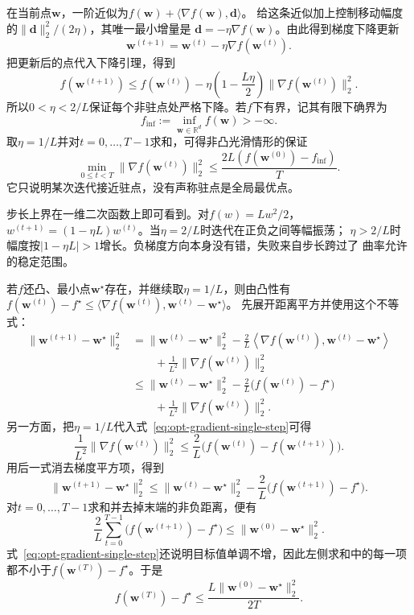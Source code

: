 在当前点$\bm w$，一阶近似为$f(\bm w)+\langle\nabla f(\bm w),\bm d\rangle$。
给这条近似加上控制移动幅度的$\|\bm d\|_2^2/(2\eta)$，其唯一最小增量是
$\bm d=-\eta\nabla f(\bm w)$。由此得到梯度下降更新
\begin{equation}
  \bm{w}^{(t+1)}
  =\bm{w}^{(t)}-\eta\nabla f(\bm{w}^{(t)}).
  \label{eq:opt-gradient-descent}
\end{equation}
把更新后的点代入下降引理，得到
\begin{equation}
  f(\bm{w}^{(t+1)})
  \leq f(\bm{w}^{(t)})
  -\eta\left(1-\frac{L\eta}{2}\right)
  \lVert\nabla f(\bm{w}^{(t)})\rVert_2^2.
  \label{eq:opt-gradient-single-step}
\end{equation}
所以$0<\eta<2/L$保证每个非驻点处严格下降。若$f$下有界，记其有限下确界为
\[
  f_{\inf}:=\inf_{\bm{w}\in\mathbb{R}^d}f(\bm{w})>-\infty.
\]
取$\eta=1/L$并对$t=0,\ldots,T-1$求和，可得非凸光滑情形的保证
\begin{equation}
  \min_{0\leq t<T}\lVert\nabla f(\bm{w}^{(t)})\rVert_2^2
  \leq
  \frac{2L(f(\bm{w}^{(0)})-f_{\inf})}{T}.
  \label{eq:opt-nonconvex-gradient-rate}
\end{equation}
它只说明某次迭代接近驻点，没有声称驻点是全局最优点。

步长上界在一维二次函数上即可看到。对$f(w)=Lw^2/2$，
$w^{(t+1)}=(1-\eta L)w^{(t)}$。当$\eta=2/L$时迭代在正负之间等幅振荡；
$\eta>2/L$时幅度按$|1-\eta L|>1$增长。负梯度方向本身没有错，失败来自步长跨过了
曲率允许的稳定范围。

若$f$还凸、最小点$\bm{w}^{\star}$存在，并继续取$\eta=1/L$，则由凸性有
$f(\bm{w}^{(t)})-f^\star
\leq\langle\nabla f(\bm{w}^{(t)}),\bm{w}^{(t)}-\bm{w}^{\star}\rangle$。
先展开距离平方并使用这个不等式：
\begin{align*}
  \lVert\bm{w}^{(t+1)}-\bm{w}^{\star}\rVert_2^2
  &=
  \lVert\bm{w}^{(t)}-\bm{w}^{\star}\rVert_2^2
  -\frac{2}{L}
  \left\langle\nabla f(\bm{w}^{(t)}),
  \bm{w}^{(t)}-\bm{w}^{\star}\right\rangle\\
  &\qquad
  +\frac{1}{L^2}\lVert\nabla f(\bm{w}^{(t)})\rVert_2^2\\
  &\leq
  \lVert\bm{w}^{(t)}-\bm{w}^{\star}\rVert_2^2
  -\frac{2}{L}\bigl(f(\bm{w}^{(t)})-f^\star\bigr)\\
  &\qquad
  +\frac{1}{L^2}\lVert\nabla f(\bm{w}^{(t)})\rVert_2^2.
\end{align*}
另一方面，把$\eta=1/L$代入式~\eqref{eq:opt-gradient-single-step}可得
\[
  \frac{1}{L^2}\lVert\nabla f(\bm{w}^{(t)})\rVert_2^2
  \leq
  \frac{2}{L}\bigl(
  f(\bm{w}^{(t)})-f(\bm{w}^{(t+1)})\bigr).
\]
用后一式消去梯度平方项，得到
\[
  \lVert\bm{w}^{(t+1)}-\bm{w}^{\star}\rVert_2^2
  \leq
  \lVert\bm{w}^{(t)}-\bm{w}^{\star}\rVert_2^2
  -\frac{2}{L}\bigl(f(\bm{w}^{(t+1)})-f^\star\bigr).
\]
对$t=0,\ldots,T-1$求和并去掉末端的非负距离，便有
\[
  \frac{2}{L}\sum_{t=0}^{T-1}
  \bigl(f(\bm{w}^{(t+1)})-f^\star\bigr)
  \leq
  \lVert\bm{w}^{(0)}-\bm{w}^{\star}\rVert_2^2.
\]
式~\eqref{eq:opt-gradient-single-step}还说明目标值单调不增，因此左侧求和中的每一项
都不小于$f(\bm{w}^{(T)})-f^\star$。于是
\begin{equation}
  f(\bm{w}^{(T)})-f^\star
  \leq\frac{L\lVert\bm{w}^{(0)}-\bm{w}^{\star}\rVert_2^2}{2T}.
  \label{eq:opt-convex-gradient-rate}
\end{equation}

